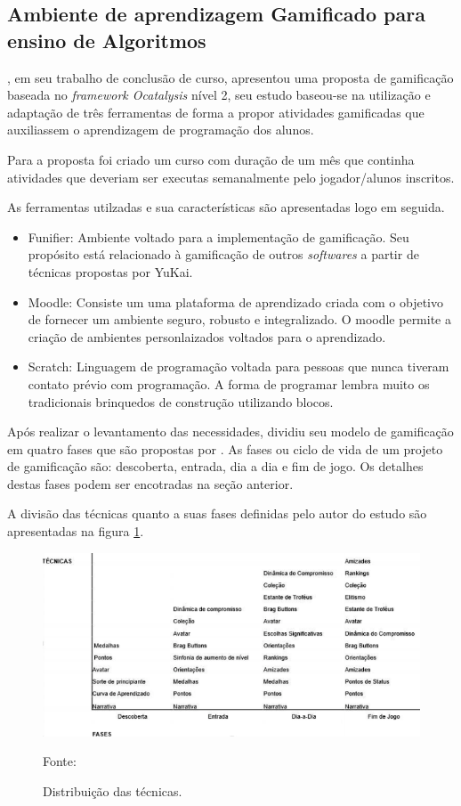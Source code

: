 \subsection{Ambiente de aprendizagem Gamificado para ensino de Algoritmos}

, em seu trabalho de conclusão de curso, apresentou uma proposta de gamificação baseada no \textit{framework Ocatalysis} nível 2, seu estudo baseou-se na
utilização e adaptação de três ferramentas de forma a propor atividades gamificadas que auxiliassem o aprendizagem de programação dos alunos.

Para a proposta foi criado um curso com duração de um mês que continha atividades que deveriam ser executas semanalmente pelo
jogador/alunos inscritos.

As ferramentas utilzadas e sua características são apresentadas logo em seguida.

\begin{itemize}
	\item Funifier: Ambiente voltado para a implementação de gamificação. Seu propósito está relacionado à gamificação de outros \textit{softwares}
		a partir de técnicas propostas por YuKai.
	\item Moodle: Consiste um uma plataforma de aprendizado criada com o objetivo de fornecer um ambiente seguro, robusto e integralizado.
		O moodle permite a criação de ambientes personlaizados voltados para o aprendizado.
	\item Scratch: Linguagem de programação voltada para pessoas que nunca tiveram contato prévio com programação. A forma de programar lembra
		muito os tradicionais brinquedos de construção utilizando blocos.
\end{itemize}

Após realizar o levantamento das necessidades,  dividiu seu modelo de gamificação em quatro fases que são propostas por .
As fases ou ciclo de vida de um projeto de gamificação são: descoberta, entrada, dia a dia e fim de jogo. Os detalhes destas fases podem ser encotradas na seção anterior.

A divisão das técnicas quanto a suas fases definidas pelo autor do estudo são apresentadas na figura \ref{fases}. 

\begin{figure}[h]
	\centering
	\includegraphics[keepaspectratio=true,scale=0.65]{figuras/fases.png}
	\caption{Distribuição das técnicas.}
	Fonte: \cite{wilker}
	\label{fases}
\end{figure}

